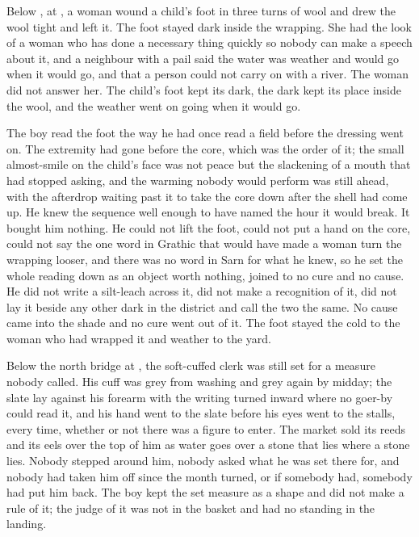 \scenebreak

Below , at , a woman wound a child's foot in three turns of wool and drew the wool tight and left it. The foot stayed dark inside the wrapping. She had the look of a woman who has done a necessary thing quickly so nobody can make a speech about it, and a neighbour with a pail said the water was weather and would go when it would go, and that a person could not carry on with a river. The woman did not answer her. The child's foot kept its dark, the dark kept its place inside the wool, and the weather went on going when it would go.

The boy read the foot the way he had once read a field before the dressing went on. The extremity had gone before the core, which was the order of it; the small almost-smile on the child's face was not peace but the slackening of a mouth that had stopped asking, and the warming nobody would perform was still ahead, with the afterdrop waiting past it to take the core down after the shell had come up. He knew the sequence well enough to have named the hour it would break. It bought him nothing. He could not lift the foot, could not put a hand on the core, could not say the one word in Grathic that would have made a woman turn the wrapping looser, and there was no word in Sarn for what he knew, so he set the whole reading down as an object worth nothing, joined to no cure and no cause. He did not write a silt-leach across it, did not make a recognition of it, did not lay it beside any other dark in the district and call the two the same. No cause came into the shade and no cure went out of it. The foot stayed the cold to the woman who had wrapped it and weather to the yard.

Below the north bridge at , the soft-cuffed clerk was still set for a measure nobody called. His cuff was grey from washing and grey again by midday; the slate lay against his forearm with the writing turned inward where no goer-by could read it, and his hand went to the slate before his eyes went to the stalls, every time, whether or not there was a figure to enter. The market sold its reeds and its eels over the top of him as water goes over a stone that lies where a stone lies. Nobody stepped around him, nobody asked what he was set there for, and nobody had taken him off since the month turned, or if somebody had, somebody had put him back. The boy kept the set measure as a shape and did not make a rule of it; the judge of it was not in the basket and had no standing in the landing.

